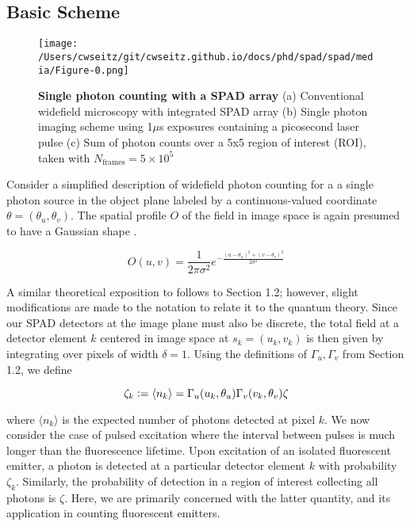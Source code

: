 \subsection{Basic Scheme}

\begin{figure*}[t]
\centering
\texttt{[image: /Users/cwseitz/git/cwseitz.github.io/docs/phd/spad/spad/media/Figure-0.png]}
\caption{\textbf{Single photon counting with a SPAD array} (a) Conventional widefield microscopy with integrated SPAD array (b) Single photon imaging scheme using 1$\mu$s exposures containing a picosecond laser pulse (c) Sum of photon counts over a 5x5 region of interest (ROI), taken with $N_{\mathrm{frames}}=5\times 10^{5}$}
\label{fig:fig5}
\end{figure*}    

Consider a simplified description of widefield photon counting for a a single photon source in the object plane labeled by a continuous-valued coordinate $\theta=(\theta_u,\theta_v)$. The spatial profile $O$ of the field in image space is again presumed to have a Gaussian shape \parencite{Zhang2007,Richards1959,Gibson1989}. 

\begin{equation}
O(u,v) = \frac{1}{2\pi\sigma^{2}}e^{-\frac{(u-\theta_u)^2+(v-\theta_v)^2}{2\sigma^2}}
\end{equation}

A similar theoretical exposition to follows to Section 1.2; however, slight modifications are made to the notation to relate it to the quantum theory. Since our SPAD detectors at the image plane must also be discrete, the total field at a detector element $k$ centered in image space at $s_k=(u_k,v_k)$ is then given by integrating over pixels of width $\delta=1$. Using the definitions of $\Gamma_u,\Gamma_v$ from Section 1.2, we define

\begin{equation}
\zeta_{k}\vcentcolon = \langle n_{k} \rangle = \Gamma_{u}(u_k,\theta_u)\Gamma_{v}(v_k,\theta_v)\zeta
\end{equation}

where $\langle n_{k} \rangle$ is the expected number of photons detected at pixel $k$. We now consider the case of pulsed excitation where the interval between pulses is much longer than the fluorescence lifetime. Upon excitation of an isolated fluorescent emitter, a photon is detected at a particular detector element $k$ with probability $\zeta_{k}$. Similarly, the probability of detection in a region of interest collecting all photons is $\zeta$. Here, we are primarily concerned with the latter quantity, and its application in counting fluorescent emitters.


